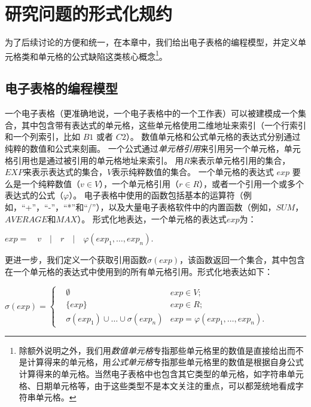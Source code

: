 \chapter{研究问题的形式化规约}

为了后续讨论的方便和统一，在本章中，我们给出电子表格的编程模型，并定义单元格类和单元格的公式缺陷这类核心概念\footnote{除额外说明之外，我们用\textit{数值单元格}专指那些单元格里的数值是直接给出而不是计算得来的单元格，用\textit{公式单元格}专指那些单元格里的数值是根据自身公式计算得来的单元格。当然电子表格中也包含其它类型的单元格，如字符串单元格、日期单元格等，由于这些类型不是本文关注的重点，可以都笼统地看成字符串单元格。}。


\section{电子表格的编程模型}

一个电子表格（更准确地说，一个电子表格中的一个工作表）可以被建模成一个集合，其中包含带有表达式的单元格，这些单元格使用二维地址来索引（一个行索引和一个列索引，比如 $B1$ 或者 $C2$）。
数值单元格和公式单元格的表达式分别通过纯粹的数值和公式来刻画。
一个公式通过\textit{单元格引用}来引用另一个单元格，单元格引用也是通过被引用的单元格地址来索引。
用$R$来表示单元格引用的集合，$EXP$来表示表达式的集合，$V$表示纯粹数值的集合。
一个单元格的表达式 $exp$ 要么是一个纯粹数值（$v \in V$），一个单元格引用（$r \in R$），或者一个引用一个或多个表达式的公式（$\varphi $）。
电子表格中使用的函数包括基本的运算符（例如，“+”，“-”，“*”和“/”），以及大量电子表格软件中的内置函数（例如，$SUM$，$AVERAGE$和$MAX$）。
形式化地表达，一个单元格的表达式$exp$为：
\begin{definition}
    $ exp =\quad v\quad |\quad r\quad |\quad \varphi (exp_1,\dots,exp_n). $
\end{definition}

更进一步，我们定义一个获取引用函数$\sigma(exp)$，该函数返回一个集合，其中包含在一个单元格的表达式中使用到的所有单元格引用。形式化地表达如下：
\begin{definition}
$
\sigma(exp) = 
\left\{
    \begin{aligned}
       & \emptyset & exp \in V; \\
       & \{exp\}     & exp \in R; \\
       & \sigma(exp_1) \cup \dots \cup \sigma(exp_n) & exp = \varphi(exp_1, \dots , exp_n).
    \end{aligned}
\right.
$
\end{definition}





